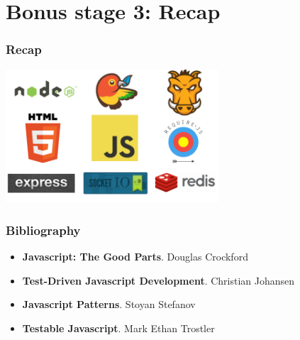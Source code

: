 \section{Bonus stage 3: Recap}

\begin{frame}[fragile]
  \frametitle{Recap}

  \begin{center}
    \includegraphics[width=300px]{images/recap.png}
  \end{center}
\end{frame}

\begin{frame}[fragile]
  \frametitle{Bibliography}

  \begin{itemize}
    \item \textbf{Javascript: The Good Parts}. Douglas Crockford
    \item \textbf{Test-Driven Javascript Development}. Christian Johansen
    \item \textbf{Javascript Patterns}. Stoyan Stefanov
    \item \textbf{Testable Javascript}. Mark Ethan Trostler
  \end{itemize}
\end{frame}
